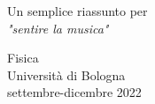 \documentclass[
10pt, %
a4paper, %
oneside, %
headinclude,footinclude, %
BCOR5mm, %
]{scrartcl}
\begin{document}
	\begin{titlepage}
		\begin{center}
			\vspace*{1cm}
			
			\Huge{\normalfont{}} %
			
			\vspace{0.5cm}
			
			\vspace{1.5cm}
			
			\Large{}
			
			\vspace{3.5cm}
			\LARGE{Un semplice riassunto per\\
				\textit{"sentire la musica"}}\\
			
			\vfill
			
			\vspace{2cm}
			\Large
			Fisica\\
			Università di Bologna\\
			settembre-dicembre 2022
			
		\end{center}
	\end{titlepage}
	
	
	\renewcommand{\sectionmark}[1]{\markright{\spacedlowsmallcaps{#1}}} %
	\lehead{\mbox{\llap{\small\thepage\kern1em\color{halfgray} \vline}\color{halfgray}\hspace{0.5em}\rightmark\hfil}} %
	
	\pagestyle{scrheadings} %
	
	
	
\end{document}
